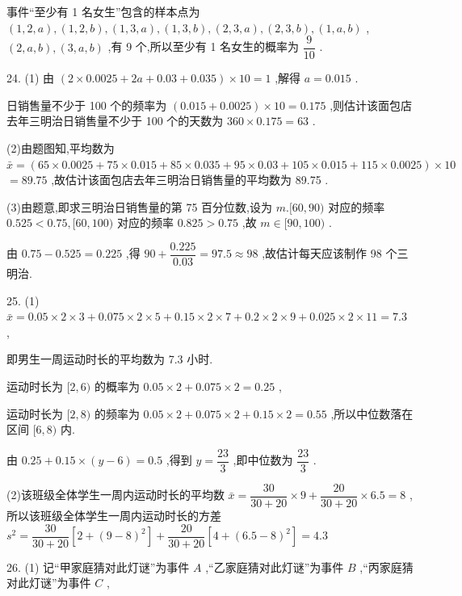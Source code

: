 事件“至少有 1 名女生”包含的样本点为 $\left( {1,2,a}\right) ,\left( {1,2,b}\right) ,\left( {1,3,a}\right) ,\left( {1,3,b}\right) ,\left( {2,3,a}\right) ,\left( {2,3,b}\right) ,\left( {1,a,b}\right)$ , $\left( {2,a,b}\right) ,\left( {3,a,b}\right)$ ,有 9 个,所以至少有 1 名女生的概率为 $\dfrac{9}{10}$ .

24. (1) 由 $\left( {2 \times  {0.0025} + {2a} + {0.03} + {0.035}}\right)  \times  {10} = 1$ ,解得 $a = {0.015}$ .

日销售量不少于 100 个的频率为 $\left( {{0.015} + {0.0025}}\right)  \times  {10} = {0.175}$ ,则估计该面包店去年三明治日销售量不少于 100 个的天数为 ${360} \times  {0.175} = {63}$ .

(2)由题图知,平均数为 $\bar{x} = \left( {{65} \times  {0.0025} + {75} \times  {0.015} + {85} \times  {0.035} + {95} \times  {0.03} + {105} \times  {0.015} + {115} \times  {0.0025}}\right)  \times  {10}$  $= {89.75}$ ,故估计该面包店去年三明治日销售量的平均数为 89.75 .

(3)由题意,即求三明治日销售量的第 75 百分位数,设为 $m.\lbrack {60},{90})$ 对应的频率 ${0.525} < {0.75},\lbrack {60},{100})$ 对应的频率 ${0.825} > {0.75}$ ,故 $m \in  \lbrack {90},{100})$ .

由 ${0.75} - {0.525} = {0.225}$ ,得 ${90} + \dfrac{0.225}{0.03} = {97.5} \approx  {98}$ ,故估计每天应该制作 98 个三明治.

25. (1) $\bar{x} = {0.05} \times  2 \times  3 + {0.075} \times  2 \times  5 + {0.15} \times  2 \times  7 + {0.2} \times  2 \times  9 + {0.025} \times  2 \times  {11} = {7.3}$ ,

即男生一周运动时长的平均数为 7.3 小时.

运动时长为 $\lbrack 2,6)$ 的概率为 ${0.05} \times  2 + {0.075} \times  2 = {0.25}$ ,

运动时长为 $\lbrack 2,8)$ 的频率为 ${0.05} \times  2 + {0.075} \times  2 + {0.15} \times  2 = {0.55}$ ,所以中位数落在区间 $\lbrack 6,8)$ 内.

由 ${0.25} + {0.15} \times  \left( {y - 6}\right)  = {0.5}$ ,得到 $y = \dfrac{23}{3}$ ,即中位数为 $\dfrac{23}{3}$ .

(2)该班级全体学生一周内运动时长的平均数 $\bar{x} = \dfrac{30}{{30} + {20}} \times  9 + \dfrac{20}{{30} + {20}} \times  {6.5} = 8$ ,所以该班级全体学生一周内运动时长的方差 ${s}^{2} = \dfrac{30}{{30} + {20}}\left\lbrack  {2 + {\left( 9 - 8\right) }^{2}}\right\rbrack   + \dfrac{20}{{30} + {20}}\left\lbrack  {4 + {\left( {6.5} - 8\right) }^{2}}\right\rbrack   = {4.3}$

26. (1) 记“甲家庭猜对此灯谜”为事件 $A$ ,“乙家庭猜对此灯谜”为事件 $B$ ,“丙家庭猜对此灯谜”为事件 $C$ ,

